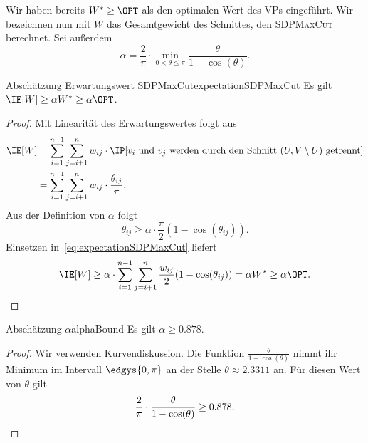\documentclass[language=ngerman,algolist]{TemplateLecture}
\begin{document}
Wir haben bereits $W^* \geq \OPT$ als den optimalen Wert des VPs eingeführt. Wir bezeichnen nun mit $W$ das Gesamtgewicht des Schnittes, den \textsc{SDPMaxCut} berechnet. Sei außerdem 
\begin{equation}
    \alpha = \frac{2}{\pi} \cdot \min_{0 < \theta \leq \pi} \frac{\theta}{1 - \cos(\theta)}. \label{eq:alphaInVP}
\end{equation}

\begin{lem}{Abschätzung Erwartungswert SDPMaxCut}{expectationSDPMaxCut}
    Es gilt $\IE[W] \geq \alpha W^* \geq \alpha \OPT$.
\end{lem}

\begin{proof}
    Mit Linearität des Erwartungswertes folgt aus~
    \begin{align}
        \IE[W] &= \sum_{i = 1}^{n-1} \sum_{j = i + 1}^n w_{ij} \cdot \IP[\text{$v_i$ und $v_j$ werden durch den Schnitt $(U, V \setminus U)$ getrennt}] \nonumber \\
        &= \sum_{i = 1}^{n-1} \sum_{j = i + 1}^n w_{ij} \cdot  \frac{\theta_{ij}}{\pi}. \label{eq:expectationSDPMaxCut}
    \end{align}
    Aus der Definition von $\alpha$ folgt 
    \begin{equation*}
        \theta_{ij} \geq \alpha \cdot \frac{\pi}{2}(1 - \cos(\theta_{ij})).
    \end{equation*}
    Einsetzen in~\eqref{eq:expectationSDPMaxCut} liefert 
    \begin{equation*}
        \IE[W] \geq \alpha \cdot \sum_{i = 1}^{n-1} \sum_{j = i + 1}^n \frac{w_{ij}}{2} (1 - \cos(\theta_{ij})) = \alpha W^* \geq \alpha \OPT. \qedhere
    \end{equation*}
\end{proof}

\begin{lem}{Abschätzung $\alpha$}{alphaBound}
    Es gilt $\alpha \geq 0.878$.
\end{lem}

\begin{proof}
    Wir verwenden Kurvendiskussion. Die Funktion $\frac{\theta}{1 - \cos(\theta)}$ nimmt ihr Minimum im Intervall $\edgys{0,\pi}$ an der Stelle $\theta \approx 2.3311$ an. Für diesen Wert von $\theta$ gilt 
    \begin{equation*}
        \frac{2}{\pi} \cdot \frac{\theta}{1 - \cos(\theta)} \geq 0.878.\qedhere
    \end{equation*}
\end{proof}
\end{document}
